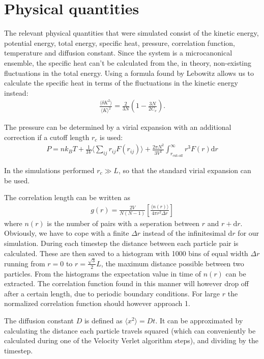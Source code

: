\section{Physical quantities}
The relevant physical quantities that were simulated consist of the kinetic energy, potential energy, total energy, specific heat, pressure, correlation function, temperature and diffusion constant. Since the system is a microcanonical ensemble, the specific heat can't be calculated from the, in theory, non-existing fluctuations in the total energy\cite{jos}. Using a formula found by Lebowitz \cite{lebowitz1967ensemble} allows us to calculate the specific heat in terms of the fluctuations in the kinetic energy instead:
\begin{gather*}
    \frac{\langle \delta K^2\rangle}{\langle K\rangle^2}=\frac{2}{3N}\left( 1-\frac{3N}{2C_v}\right).
\end{gather*}

The pressure can be determined by a virial expansion with an additional correction if a cutoff length $r_c$ is used:
\begin{gather*}
    P = nk_BT + \frac{1}{3V}\Big \langle \sum_{ij} r_{ij}F(r_{ij})\Big \rangle + \frac{2\pi N^2}{3V^2}\int_{r_{\text{cut-off}}}^{\infty}r^3 F(r) \text{d}r
\end{gather*}

In the simulations performed $r_c \gg L$, so that the standard virial expansion can be used.

The correlation length can be written as
\begin{gather*}
    g(r)=\frac{2V}{N(N-1)}\left[\frac{\langle n(r)\rangle}{4\pi r^2\Delta r}\right]
\end{gather*}
where $n(r)$ is the number of pairs with a seperation between $r$ and $r + \mathrm{d}r$. Obviously, we have to cope with a finite $\Delta r$ instead of the infinitesimal $\mathrm{d}r$ for our simulation. During each timestep the distance between each particle pair is calculated. These are then saved to a histogram with 1000 bins of equal width $\Delta r$ running from $r = 0$ to $r = \frac{\sqrt{3}}{2}L$, the maximum distance possible between two particles. From the histograms the expectation value in time of $n(r)$ can be extracted. The correlation function found in this manner will however drop off after a certain length, due to periodic boundary conditions. For large $r$ the normalized correlation function should however approach 1.

The diffusion constant $D$ is defined as $\langle x^2\rangle = Dt$. It can be approximated by calculating the distance each particle travels squared (which can conveniently be calculated during one of the Velocity Verlet algorithm steps), and dividing by the timestep.